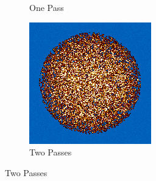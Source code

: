 \begin{figure}[h!]
\begin{subfigure}{0.25\textwidth}
  \caption{One Pass}
  \label{fig:bstep1}
\end{subfigure}%
%
\begin{subfigure}{0.25\textwidth}
  \includegraphics[width=0.95\linewidth]{figures/burn-20-bstep2}
  \caption{Two Passes}
  \label{fig:bstep2}
\end{subfigure}%


\end{figure}

